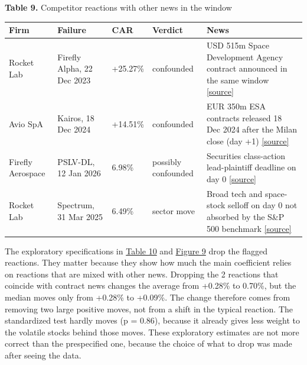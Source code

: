 \documentclass[12pt,a4paper]{article}
\begin{document}
\par\noindent\begin{minipage}{\textwidth}\hypertarget{tab-flag}{}
\textbf{Table 9.} Competitor reactions with other news in the window

{\small\setlength{\tabcolsep}{4pt}\begin{tabularx}{\textwidth}{lXllX}
\toprule
\textbf{Firm} & \textbf{Failure} & \textbf{CAR} & \textbf{Verdict} & \textbf{News} \\
\midrule
Rocket Lab & Firefly Alpha, 22 Dec 2023 & +25.27\% & confounded & USD 515m Space Development Agency contract announced in the same window \href{https://www.fool.com/investing/2023/12/22/why-rocket-lab-stock-is-going-to-the-moon-today}{[source]} \\
Avio SpA & Kairos, 18 Dec 2024 & +14.51\% & confounded & EUR 350m ESA contracts released 18 Dec 2024 after the Milan close (day +1) \href{https://www.emarketstorage.it/sites/default/files/comunicati/2024-12/20241218_158732.pdf}{[source]} \\
Firefly Aerospace & PSLV-DL, 12 Jan 2026 & \textminus{}6.98\% & possibly confounded & Securities class-action lead-plaintiff deadline on day 0 \href{https://finviz.com/news/268191/shareholders-of-firefly-aerospace-inc-should-contact-levi-korsinsky-before-january-12-2026-to-discuss-your-rights-fly}{[source]} \\
Rocket Lab & Spectrum, 31 Mar 2025 & \textminus{}6.49\% & sector move & Broad tech and space-stock selloff on day 0 not absorbed by the S\&P 500 benchmark \href{https://finviz.com/news/13588/why-rocket-lab-planet-labs-and-ast-spacemobile-stocks-all-dropped-on-monday}{[source]} \\
\bottomrule
\end{tabularx}}
\vspace{6pt}

\end{minipage}\par\vspace{4pt}

The exploratory specifications in \hyperlink{tab-conf}{Table 10} and \hyperlink{fig-conf}{Figure 9} drop the flagged reactions. They matter because they show how much the main coefficient relies on reactions that are mixed with other news. Dropping the 2 reactions that coincide with contract news changes the average from +0.28\% to \textminus{}0.70\%, but the median moves only from +0.28\% to +0.09\%. The change therefore comes from removing two large positive moves, not from a shift in the typical reaction. The standardized test hardly moves (p = 0.86), because it already gives less weight to the volatile stocks behind those moves. These exploratory estimates are not more correct than the prespecified one, because the choice of what to drop was made after seeing the data.
\end{document}
